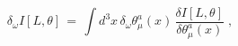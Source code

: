 \begin{equation}
\delta_\omega I[L,\theta] \,=\, \int d^3x \, \delta_\omega
\theta_\mu^a (x) \, \frac{\delta I[L,\theta]}{\delta \theta_\mu^a (x)} 
\;,
\end{equation}

